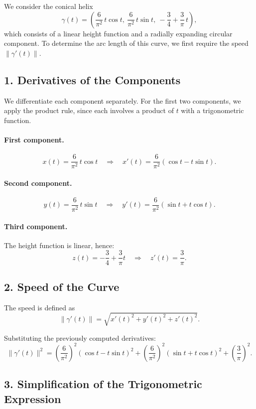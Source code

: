 We consider the conical helix
\[
\gamma(t)
= \left(
\frac{6}{\pi^{2}}\,t\cos t,\ 
\frac{6}{\pi^{2}}\,t\sin t,\ 
-\frac{3}{4}+\frac{3}{\pi}\,t
\right),
\]
which consists of a linear height function and a radially expanding circular component.
To determine the arc length of this curve, we first require the
speed $\|\gamma'(t)\|$.

\subsection*{1. Derivatives of the Components}

We differentiate each component separately. For the first two
components, we apply the product rule, since each involves a product of $t$ with a
trigonometric function.

\paragraph{First component.}
\[
x(t)=\frac{6}{\pi^{2}}\,t\cos t
\quad\Rightarrow\quad
x'(t)=\frac{6}{\pi^{2}}(\cos t - t\sin t).
\]

\paragraph{Second component.}
\[
y(t)=\frac{6}{\pi^{2}}\,t\sin t
\quad\Rightarrow\quad
y'(t)=\frac{6}{\pi^{2}}(\sin t + t\cos t).
\]

\paragraph{Third component.}
The height function is linear, hence:
\[
z(t)=-\frac{3}{4}+\frac{3}{\pi}t
\quad\Rightarrow\quad
z'(t)=\frac{3}{\pi}.
\]

\subsection*{2. Speed of the Curve}

The speed is defined as
\[
\|\gamma'(t)\|=\sqrt{x'(t)^2 + y'(t)^2 + z'(t)^2}.
\]

Substituting the previously computed derivatives:
\[
\|\gamma'(t)\|^{2}
=
\left(\frac{6}{\pi^{2}}\right)^{2}(\cos t - t\sin t)^{2}
+
\left(\frac{6}{\pi^{2}}\right)^{2}(\sin t + t\cos t)^{2}
+
\left(\frac{3}{\pi}\right)^{2}.
\]

\subsection*{3. Simplification of the Trigonometric Expression}

